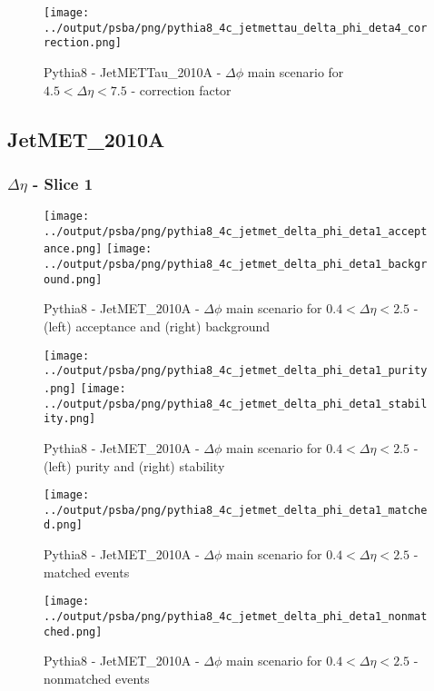 \documentclass[11pt]{book}
\begin{document}
\begin{figure}[ht]
\centering
\texttt{[image: ../output/psba/png/pythia8\_4c\_jetmettau\_delta\_phi\_deta4\_correction.png]}
\caption{Pythia8 - JetMETTau\_2010A - $\Delta\phi$ main scenario for $4.5 < \Delta\eta < 7.5$ - correction factor}
\label{fig:p8_jetmettau_delta_phi_deta4_correction}
\end{figure}


\clearpage
\subsection{JetMET\_2010A}

\subsubsection{$\Delta\eta$ - Slice 1}
\begin{figure}[ht]
\centering
\texttt{[image: ../output/psba/png/pythia8\_4c\_jetmet\_delta\_phi\_deta1\_acceptance.png]}
\texttt{[image: ../output/psba/png/pythia8\_4c\_jetmet\_delta\_phi\_deta1\_background.png]}
\caption{Pythia8 - JetMET\_2010A - $\Delta\phi$ main scenario for $0.4 < \Delta\eta < 2.5$ - (left) acceptance and (right) background}
\label{fig:p8_jetmet_delta_phi_deta1_ab}
\end{figure}

\begin{figure}[ht]
\centering
\texttt{[image: ../output/psba/png/pythia8\_4c\_jetmet\_delta\_phi\_deta1\_purity.png]}
\texttt{[image: ../output/psba/png/pythia8\_4c\_jetmet\_delta\_phi\_deta1\_stability.png]}
\caption{Pythia8 - JetMET\_2010A - $\Delta\phi$ main scenario for $0.4 < \Delta\eta < 2.5$ - (left) purity and (right) stability}
\label{fig:p8_jetmet_delta_phi_deta1_ps}
\end{figure}

\begin{figure}[ht]
\centering
\texttt{[image: ../output/psba/png/pythia8\_4c\_jetmet\_delta\_phi\_deta1\_matched.png]}
\caption{Pythia8 - JetMET\_2010A - $\Delta\phi$ main scenario for $0.4 < \Delta\eta < 2.5$ - matched events}
\label{fig:p8_jetmet_delta_phi_deta1_matched}
\end{figure}

\begin{figure}[ht]
\centering
\texttt{[image: ../output/psba/png/pythia8\_4c\_jetmet\_delta\_phi\_deta1\_nonmatched.png]}
\caption{Pythia8 - JetMET\_2010A - $\Delta\phi$ main scenario for $0.4 < \Delta\eta < 2.5$ - nonmatched events}
\label{fig:p8_jetmet_delta_phi_deta1_nonmatched}
\end{figure}
\end{document}
